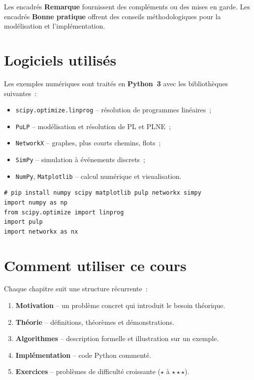 \begin{remarque}
Les encadr\'es \textbf{Remarque} fournissent des compl\'ements ou des mises en
garde. Les encadr\'es \textbf{Bonne pratique} offrent des conseils
m\'ethodologiques pour la mod\'elisation et l'impl\'ementation.
\end{remarque}

\section*{Logiciels utilis\'es}

Les exemples num\'eriques sont trait\'es en \textbf{Python~3} avec les
biblioth\`eques suivantes~:

\begin{itemize}
  \item \texttt{scipy.optimize.linprog} -- r\'esolution de programmes lin\'eaires~;
  \item \texttt{PuLP} -- mod\'elisation et r\'esolution de PL et PLNE~;
  \item \texttt{NetworkX} -- graphes, plus courts chemins, flots~;
  \item \texttt{SimPy} -- simulation \`a \'ev\'enements discrets~;
  \item \texttt{NumPy}, \texttt{Matplotlib} -- calcul num\'erique et
        visualisation.
\end{itemize}

\begin{codeblock}[title=\textbf{Installation des d\'ependances}]
\begin{verbatim}
# pip install numpy scipy matplotlib pulp networkx simpy
import numpy as np
from scipy.optimize import linprog
import pulp
import networkx as nx
\end{verbatim}
\end{codeblock}

\section*{Comment utiliser ce cours}

Chaque chapitre suit une structure r\'ecurrente~:
\begin{enumerate}
  \item \textbf{Motivation} -- un probl\`eme concret qui introduit le besoin
        th\'eorique.
  \item \textbf{Th\'eorie} -- d\'efinitions, th\'eor\`emes et d\'emonstrations.
  \item \textbf{Algorithmes} -- description formelle et illustration sur un
        exemple.
  \item \textbf{Impl\'ementation} -- code Python comment\'e.
  \item \textbf{Exercices} -- probl\`emes de difficult\'e croissante
        ($\star$ \`a $\star\star\star$).
\end{enumerate}


